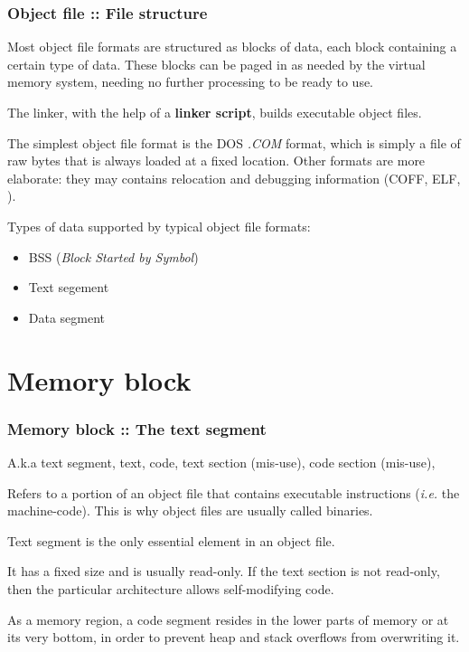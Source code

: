 
\begin{frame}
  \frametitle{Object file :: File structure}

Most object file
formats are structured as blocks of data, each block containing a
certain type of data. These blocks can be paged in as needed by the
virtual memory system, needing no further processing to be ready to use.

\-

The linker, with the help of a \textbf{linker script}, builds executable object files.

\-

The simplest object file format is the DOS \textit{.COM} format,
which is simply a file of raw bytes that is always loaded at a fixed
location. Other formats are more elaborate: they may contains relocation
and debugging information (COFF, ELF, \etc{}).

\-

Types of data supported by typical object file formats:

\begin{itemize}
    \item
	BSS (\textit{Block Started by Symbol})
    \item
	Text segement
    \item
	Data segment
   \end{itemize}

\end{frame}



%
%

\section{Memory block}


\begin{frame}
  \frametitle{Memory block :: The text segment}

A.k.a text segment, text, code, text section (mis-use), code section (mis-use), \etc{}

\-

Refers to a portion of an object file that contains executable instructions
(\textit{i.e.} the machine-code). This is why object files are usually called
binaries.

\-

Text segment is the only essential element in an object file.

\-

It has a fixed size and is usually read-only. If the text section is
not read-only, then the particular architecture allows self-modifying
code.

\-

As a memory region, a code segment resides in the lower parts of
memory or at its very bottom, in order to prevent heap and stack
overflows from overwriting it.

\end{frame}

